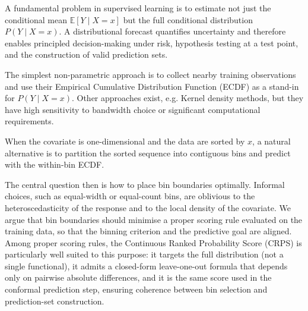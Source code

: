 \documentclass[11pt]{article}
\begin{document}
A fundamental problem in supervised learning is to estimate not just the conditional mean
$\mathbb{E}[Y \mid X=x]$ but the full conditional distribution $P(Y \mid X=x)$.
A distributional forecast quantifies uncertainty and therefore enables principled decision-making under
risk, hypothesis testing at a test point, and the construction of valid prediction sets.

The simplest non-parametric approach is to collect nearby training observations and use
their Empirical Cumulative Distribution Function (ECDF) as a stand-in for $P(Y \mid X=x)$.
Other approaches exist, e.g. Kernel density methods, but they have high sensitivity to bandwidth choice 
or significant computational requirements.

When the covariate is one-dimensional and the data are sorted by $x$, a natural alternative
is to partition the sorted sequence into contiguous bins and predict with the within-bin
ECDF.

The central question then is how to place bin boundaries optimally.
Informal choices, such as equal-width or equal-count bins, are oblivious to the
heteroscedasticity of the response and to the local density of the covariate.
We argue that bin boundaries should minimise a proper scoring rule evaluated on the
training data, so that the binning criterion and the predictive goal are aligned.
Among proper scoring rules, the Continuous Ranked Probability Score (CRPS) is particularly 
well suited to this purpose: it
targets the full distribution (not a single functional), it admits a closed-form
leave-one-out formula that depends only on pairwise absolute differences, and it is the
same score used in the conformal prediction step, ensuring coherence between bin selection
and prediction-set construction.
\end{document}
